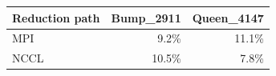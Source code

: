 \begin{tabular}{lrr}
\toprule
Reduction path & Bump\_2911 & Queen\_4147\\
\midrule
MPI & 9.2\% & 11.1\%\\
NCCL & 10.5\% & 7.8\%\\
\bottomrule
\end{tabular}
